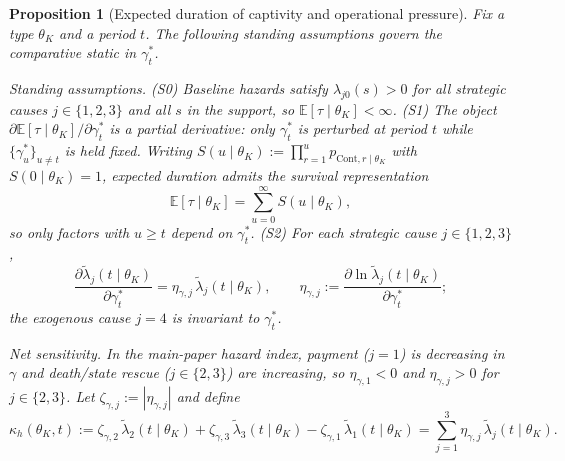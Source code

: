 \documentclass[ecta,nameyear,final,supplement]{econsocart}
\numberwithin{equation}{section}
\numberwithin{table}{section}
\newtheorem{proposition}[theorem]{Proposition}
\theoremstyle{definition}
\begin{document}

\begin{proposition}[Expected duration of captivity and operational pressure]
\label{prop:expected-captivity-gamma}
Fix a type $\theta_K$ and a period $t$. The following standing assumptions
govern the comparative static in $\gamma_t^\ast$.

\medskip
\noindent\textit{Standing assumptions.}
\textup{(S0)} Baseline hazards satisfy $\lambda_{j0}(s)>0$ for all strategic
causes $j\in\{1,2,3\}$ and all $s$ in the support, so
$\mathbb{E}[\tau\mid\theta_K]<\infty$.
\textup{(S1)} The object $\partial\mathbb{E}[\tau\mid\theta_K]/\partial\gamma_t^\ast$
is a partial derivative: only $\gamma_t^\ast$ is perturbed at period $t$ while
$\{\gamma_u^\ast\}_{u\neq t}$ is held fixed. Writing
$S(u\mid\theta_K):=\prod_{r=1}^{u}p_{\mathrm{Cont},r\mid\theta_K}$ with
$S(0\mid\theta_K)=1$, expected duration admits the survival representation
\begin{equation}
\label{eq:duracion-identidad-prop}
\mathbb{E}[\tau\mid\theta_K]=\sum_{u=0}^{\infty}S(u\mid\theta_K),
\end{equation}
so only factors with $u\ge t$ depend on $\gamma_t^\ast$.
\textup{(S2)} For each strategic cause $j\in\{1,2,3\}$,
\[
\frac{\partial\tilde\lambda_j(t\mid\theta_K)}{\partial\gamma_t^\ast}
=\eta_{\gamma,j}\,\tilde\lambda_j(t\mid\theta_K),
\qquad
\eta_{\gamma,j}:=\frac{\partial\ln\tilde\lambda_j(t\mid\theta_K)}{\partial\gamma_t^\ast};
\]
the exogenous cause $j=4$ is invariant to $\gamma_t^\ast$.

\medskip
\noindent\textit{Net sensitivity.}
In the main-paper hazard index, payment ($j=1$) is decreasing in $\gamma$ and
death/state rescue ($j\in\{2,3\}$) are increasing, so $\eta_{\gamma,1}<0$ and
$\eta_{\gamma,j}>0$ for $j\in\{2,3\}$. Let $\zeta_{\gamma,j}:=|\eta_{\gamma,j}|$
and define
\begin{equation}
\label{eq:kappa-c}
\kappa_h(\theta_K,t)
:=\zeta_{\gamma,2}\,\tilde\lambda_2(t\mid\theta_K)
 +\zeta_{\gamma,3}\,\tilde\lambda_3(t\mid\theta_K)
 -\zeta_{\gamma,1}\,\tilde\lambda_1(t\mid\theta_K)
=\sum_{j=1}^{3}\eta_{\gamma,j}\,\tilde\lambda_j(t\mid\theta_K).
\end{equation}


\end{proposition}
\end{document}
